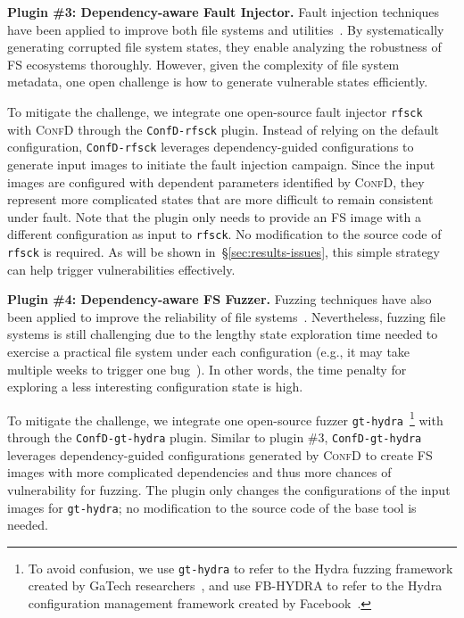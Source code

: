 \smallskip
\noindent
\textbf{Plugin \#3: Dependency-aware Fault Injector.}
Fault injection techniques have  been applied to improve both file systems and utilities~\cite{iron05,OmFAST18,Thanu-OSDI14-Crash,ShehbazJaffer-ATC19-StudyFSonSSD,e2fsprogs-test}. 
By systematically generating corrupted file system states, they enable analyzing the robustness of FS ecosystems thoroughly. 
However, given the complexity of file system metadata, 
one open challenge is how to generate vulnerable states efficiently.

To mitigate the challenge,
we integrate one open-source fault injector \texttt{rfsck}~\cite{OmFAST18} with \textsc{ConfD} through the \texttt{ConfD-rfsck} plugin.
Instead of relying on the default configuration, \texttt{ConfD-rfsck} leverages  dependency-guided configurations  to generate  input  images to initiate the fault injection campaign. Since the input images are configured with dependent parameters identified by \textsc{ConfD}, they represent more complicated states that are more difficult to remain consistent under fault. 
Note that the plugin only needs to provide an FS image with a different configuration as input to \texttt{rfsck}. No modification to the source code of  \texttt{rfsck} is required. 
As will be shown in~\S\ref{sec:results-issues}, this simple strategy can help trigger vulnerabilities  effectively.

\smallskip
\noindent
\textbf{Plugin \#4: Dependency-aware FS Fuzzer.}
Fuzzing techniques have also been applied to improve the reliability of file systems~\cite{Janus,hydra-2019}. 
Nevertheless, fuzzing file systems is still challenging due to  
the lengthy  state exploration time needed to exercise a practical file system under each configuration  (e.g., it may take multiple weeks to trigger one  bug~\cite{hydra-2019}). 
In other words,
the time penalty for exploring a less interesting configuration state is high.

To mitigate  the challenge,
we integrate one open-source fuzzer \texttt{gt-hydra}~\footnote{To avoid confusion, we use \texttt{gt-hydra} to refer to the Hydra fuzzing framework created by GaTech researchers~\cite{hydra-2019}, and use  FB-HYDRA to refer to the Hydra configuration management framework created by Facebook~\cite{Yadan2019Hydra}.}
with \prj through the \texttt{ConfD-gt-hydra} plugin.   
Similar to 
plugin \#3,
\texttt{ConfD-gt-hydra} leverages dependency-guided configurations generated by \textsc{ConfD} to create  FS images with more complicated dependencies and thus more chances of vulnerability for fuzzing. 
The plugin only changes the configurations of the input images for \texttt{gt-hydra}; no modification to the source code of the base tool is needed. 



